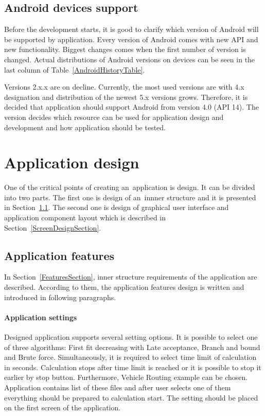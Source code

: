 \subsection{Android devices support}
Before the development starts, it is good to clarify which version of Android will be supported by application. Every
version of Android comes with new API and new functionality. Biggest changes comes when the first number of version is
changed. Actual distributions of Android versions on devices can be seen in the last column of
Table~\ref{AndroidHistoryTable}.

Versions 2.x.x are on decline. Currently, the most used versions are with 4.x designation and distribution of the newest
5.x versions grows. Therefore, it is decided that application should support Android from version 4.0 (API 14). The
version decides which resource can be used for application design and development and how application should be tested.

\section{Application design}\label{ApplicationDesignSection}
One of the critical points of creating an~application is design. It can be divided into two parts. The first one is
design of an~innner structure and it is presented in Section~\ref{ApplicationFeatureSection}. The second one is design
of graphical user interface and application component layout which is described in Section~\ref{ScreenDesignSection}.

\subsection{Application features}\label{ApplicationFeatureSection}
In Section~\ref{FeaturesSection}, inner structure requirements of the application are described. According to them, the
application features design is written and introduced in following paragraphs.

\paragraph{Application settings}
Designed application supports several setting options. It is possible to select one of three algorithms: First fit
decreasing with Late acceptance, Branch and bound and Brute force. Simultaneously, it is required to select time limit
of calculation in seconds. Calculation stops after time limit is reached or it is possible to stop it earlier by stop
button. Furthermore, Vehicle Routing example can be chosen. Application contains list of these files and after user
selects one of them everything should be prepared to calculation start. The setting should be placed on the first screen
of the application.

